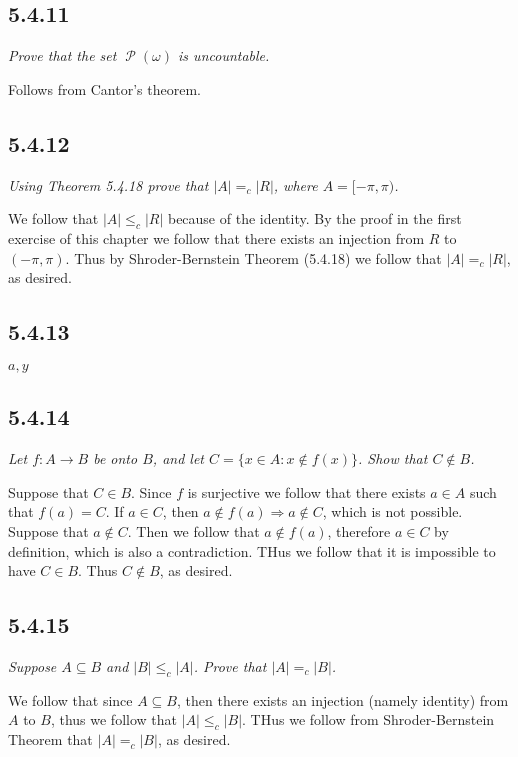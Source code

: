 \documentclass[11pt,oneside,titlepage]{book}
\DeclareMathOperator \pow {\mathcal {P}}
\DeclareMathOperator \ra {\Rightarrow}
\begin{document}
\subsection*{5.4.11}

\textit{Prove that the set $\pow(\omega)$ is uncountable.}

Follows from Cantor's theorem.

\subsection*{5.4.12}

\textit{Using Theorem 5.4.18 prove that $|A| =_c |R|$, where $A = [-\pi, \pi)$.}

We follow that $|A| \leq_c |R|$ because of the identity. By the proof in the first exercise
of this chapter we follow that there exists an injection from  $R$ to $(-\pi, \pi)$. Thus
by Shroder-Bernstein Theorem (5.4.18) we follow that $|A| =_c |R|$, as desired.

\subsection*{5.4.13}

$a, y$

\subsection*{5.4.14}

\textit{Let $f: A \to B$ be onto $B$, and let $C = \{x \in A: x \notin f(x)\}$. Show that
  $C \notin B$.}

Suppose that $C \in B$. Since $f$ is surjective we follow that there exists $a \in A$
such that $f(a) = C$. If $a \in C$, then $a \notin f(a) \ra a \notin C$, which is not possible.
Suppose that $a \notin C$. Then we follow that $a \notin f(a)$, therefore $a \in C$ by definition,
which is also a contradiction. THus we follow that it is impossible to have $C \in B$. Thus
$C \notin B$, as desired.

\subsection*{5.4.15}

\textit{Suppose $A \subseteq B$ and $|B| \leq_c |A|$. Prove that $|A| =_c |B|$.}

We follow that since $A \subseteq B$, then there exists an injection (namely identity)
from $A$ to $B$, thus we follow that $|A| \leq_c |B|$. THus we follow from
Shroder-Bernstein Theorem that $|A| =_c |B|$, as desired.
\end{document}
